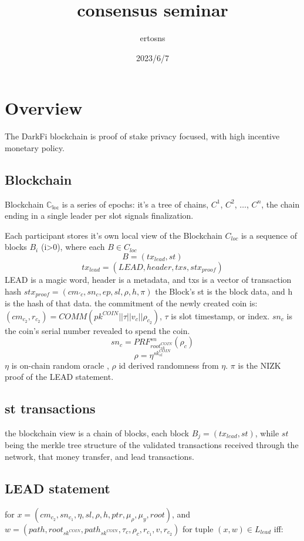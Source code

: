 \documentclass{article}
\begin{document}
\title {consensus seminar}
\author {ertosns}
\date {2023/6/7}
\maketitle

\section{ Overview}

The DarkFi blockchain is  proof of stake  privacy focused, with high incentive monetary policy.

\subsection{ Blockchain}

 Blockchain $\mathbb{C_{loc}}$ is a series of epochs: it's a tree of chains,
$C^1$, $C^2$, $\dots$, $C^n$, the chain ending in a single leader per slot signals finalization.


Each participant stores it's own local view of the Blockchain $C_{loc}$ is a sequence of blocks $B_i$ (i>0), where each $B \in C_{loc}$
$$ B = (tx_{lead},st)$$
$$tx_{lead} = (LEAD, header, txs, stx_{proof})$$
LEAD is a magic word, header is a metadata, and txs is a vector of transaction hash
$stx_{proof}=(cm_{\prime{c}},sn_c,ep,sl,\rho,h,\pi)$
the Block's st is the block data, and h is the hash of that data.
the commitment of the newly created coin is:
$(cm_{c_2},r_{c_2})=COMM(pk^{COIN}||\tau||v_c||\rho_{c_2})$,
$\tau$ is slot timestamp, or index. $sn_c$ is the coin's serial number revealed to spend the coin.
$$sn_c=PRF_{root_{sk}^{COIN}}^{sn}(\rho_c)$$
$$\rho=\eta^{sk_{sl}^{COIN}}$$
$\eta$ is on-chain random oracle , $\rho$ id derived randomness from $\eta$.  $\pi$ is the NIZK proof of the LEAD statement.


\subsection{ st transactions}
the blockchain view is a chain of blocks, each block $B_j=(tx_{lead},st)$, while $st$ being the merkle tree structure of the validated transactions received through the network, that money transfer, and lead transactions.

\subsection{ LEAD statement}
for $x=(cm_{c_2},sn_{c_1},\eta,sl,\rho,h,ptr,\mu_{\rho},\mu_{y},root)$, and
$w=(path,root_{sk^{COIN}},path_{sk^{COIN}},\tau_c,\rho_c,r_{c_1},v,r_{c_2})$
for tuple $(x,w) \in L_{lead}$ iff:
\end{document}
